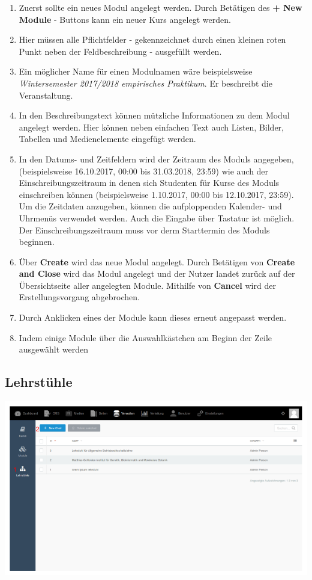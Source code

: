     \begin{enumerate}
    \item Zuerst sollte ein neues Modul angelegt werden. Durch Betätigen des \textbf{+ New Module} - Buttons kann ein neuer Kurs angelegt werden.
    \item Hier müssen alle Pflichtfelder - gekennzeichnet durch einen kleinen roten Punkt neben der Feldbeschreibung - ausgefüllt werden.
    \item Ein möglicher Name für einen Modulnamen wäre beispielsweise \textit{Wintersemester 2017/2018 empirisches Praktikum}. Er beschreibt die Veranstaltung.
    \item In den Beschreibungstext können mützliche Informationen zu dem Modul angelegt werden.
	  Hier können neben einfachen Text auch Listen, Bilder, Tabellen und Medienelemente eingefügt werden.
    \item In den Datums- und Zeitfeldern wird der Zeitraum des Moduls angegeben, (beispielsweise 16.10.2017, 00:00 bis 31.03.2018, 23:59) 
	  wie auch der Einschreibungszeitraum in denen sich Studenten für Kurse des Moduls einschreiben können (beispielsweise 1.10.2017, 00:00 bis 12.10.2017, 23:59).
	  Um die Zeitdaten anzugeben, können die aufploppenden Kalender- und Uhrmenüs verwendet werden. Auch die Eingabe über Tastatur ist möglich.
	  Der Einschreibungszeitraum muss vor derm Starttermin des Moduls beginnen.
    \item Über \textbf{Create} wird das neue Modul angelegt. 
	  Durch Betätigen von \textbf{Create and Close} wird das Modul angelegt und der Nutzer landet zurück auf der Übersichtseite aller angelegten Module.
	  Mithilfe von \textbf{Cancel} wird der Erstellungsvorgang abgebrochen.
    \item Durch Anklicken eines der Module kann dieses erneut angepasst werden.
    \item Indem einige Module über die Auswahlkästchen am Beginn der Zeile ausgewählt werden
    \end{enumerate}
    
    \subsection{Lehrstühle}
    
    \includegraphics[scale=0.3]{backend/img/chairs_1.png}
    
